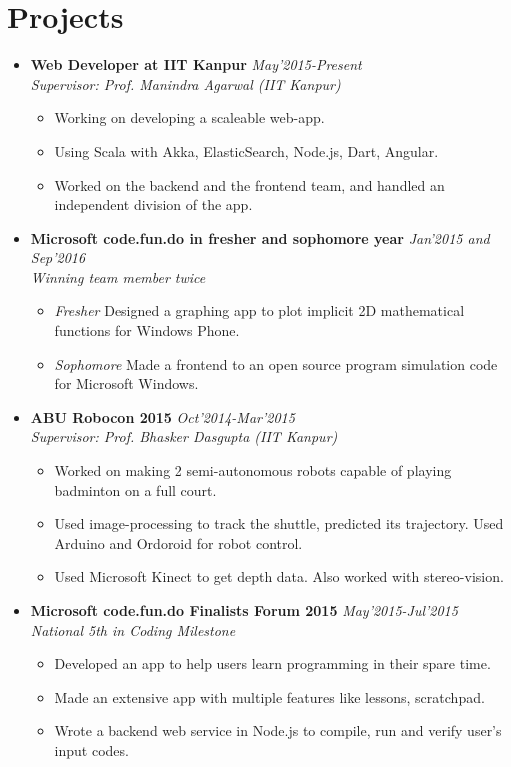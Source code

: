 \documentclass[11pt,a4paper]{article}
\begin{document}
\section*{Projects}
\begin {itemize}

\item \textbf{\large{Web Developer at IIT Kanpur}} \hfill\textit{May'2015-Present}\\ \emph{Supervisor: Prof. Manindra Agarwal (IIT Kanpur)}
  \begin{itemize}
    \setlength \itemsep{0em}
    \item Working on developing a scaleable web-app. 
    \item Using Scala with Akka, ElasticSearch, Node.js, Dart, Angular. 
    \item Worked on the backend and the frontend team, and handled an independent division of the app.
  \end{itemize}

\item \textbf{\large{Microsoft code.fun.do in fresher and sophomore year}} \hfill\textit{ Jan'2015 and Sep'2016}\\ \emph{Winning team member twice}
    \begin{itemize}
    \setlength \itemsep{0em}
    \item \textit{Fresher} Designed a graphing app to plot implicit 2D mathematical functions for Windows Phone.
    \item \textit{Sophomore} Made a frontend to an open source program simulation code for Microsoft Windows.
    \end{itemize}

\item \textbf{\large{ABU Robocon 2015}} \hfill\textit{ Oct'2014-Mar'2015}\\ \emph{Supervisor: Prof. Bhasker Dasgupta (IIT Kanpur)}
    \begin{itemize}
    \setlength \itemsep{0em}
    \item Worked on making 2 semi-autonomous robots capable of playing badminton on a full court.
    \item Used image-processing to track the shuttle, predicted its trajectory. Used Arduino and Ordoroid for robot control.
    \item Used Microsoft Kinect to get depth data. Also worked with stereo-vision.
    \end{itemize}

\item \textbf{\large{Microsoft code.fun.do Finalists Forum 2015}} \hfill\textit{ May'2015-Jul'2015}\\ \emph{National 5th in Coding Milestone}
    \begin{itemize}
    \setlength \itemsep{0em}
    \item Developed an app to help users learn programming in their spare time.
    \item Made an extensive app with multiple features like lessons, scratchpad.
    \item Wrote a backend web service in Node.js to compile, run and verify user's input codes.
    \end{itemize}


\end{itemize}
\end{document}
